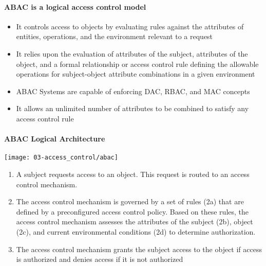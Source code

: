 \paragraph{ABAC is a logical access control model}
\begin{itemize}
    \item It controls access to objects by evaluating rules against the attributes of entities, operations, and the environment relevant to a request
    \item It relies upon the evaluation of attributes of the subject, attributes of the object, and a formal relationship or access control rule defining the allowable operations for subject-object attribute combinations in a given environment
    \item ABAC Systems are capable of enforcing DAC, RBAC, and MAC concepts
    \item It allows an unlimited number of attributes to be combined to satisfy any access control rule
\end{itemize}

\paragraph{ABAC Logical Architecture}
\begin{center}
    \texttt{[image: 03-access\_control/abac]}
    \vspace{-8pt}
\end{center}

\begin{enumerate}
    \item A subject requests access to an object. This request is routed to an access control mechanism.
    \item The access control mechanism is governed by a set of rules (2a) that are defined by a preconfigured access control policy. Based on these rules, the access control mechanism assesses the attributes of the subject (2b), object (2c), and current environmental conditions (2d) to determine authorization.
    \item The access control mechanism grants the subject access to the object if access is authorized and denies access if it is not authorized
\end{enumerate}

